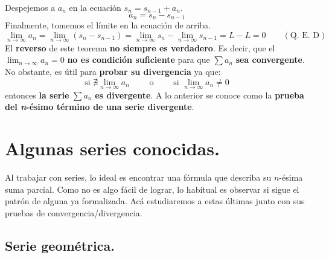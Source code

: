\documentclass[12pt]{article}
\begin{document}
Despejemos a $a_{n}$ en la ecuación $s_{n} = s_{n - 1} + a_{n}$.
\[
  a_{n} = s_{n} - s_{n - 1}
\]
Finalmente, tomemos el límite en la ecuación de arriba.
\[
  \lim_{n \to \infty} a_{n} = \lim_{n \to \infty} (s_{n} - s_{n - 1})
                            = \lim_{n \to \infty} s_{n} - \lim_{n \to \infty} s_{n - 1}
                            = L - L
                            = 0
                            \qquad (\text{Q. E. D})
\]
El \textbf{reverso} de este teorema \textbf{no siempre es verdadero}. Es decir, que el $\lim_{n \to \infty} a_{n} = 0$ \textbf{no es condición suficiente} para que $\sum a_{n}$ \textbf{sea convergente}. No obstante, es útil para \textbf{probar su divergencia} ya que:
\[
  \text{si } \nexists \lim_{n \to \infty} a_{n} \qquad \text{ o } \qquad \text{si } \lim_{n \to \infty} a_{n} \neq 0
\]
entonces \textbf{la serie} $\sum a_{n}$ \textbf{es divergente}. A lo anterior se conoce como la \textbf{prueba del \textit{n}-ésimo término de una serie divergente}.


\section{Algunas series conocidas.}

Al trabajar con series, lo ideal es encontrar una fórmula que describa su $n$-ésima suma parcial. Como no es algo fácil de lograr, lo habitual es observar si sigue el patrón de alguna ya formalizada. Acá estudiaremos a estas últimas junto con sus pruebas de convergencia/divergencia.

\subsection{Serie geométrica.}
\end{document}
